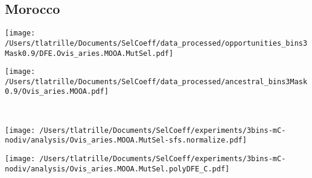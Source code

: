 \documentclass{article}
\begin{document}
    \subsection{Morocco}

    \begin{minipage}{0.49\linewidth}
        \texttt{[image: /Users/tlatrille/Documents/SelCoeff/data\_processed/opportunities\_bins3Mask0.9/DFE.Ovis\_aries.MOOA.MutSel.pdf]}
    \end{minipage}
    \begin{minipage}{0.49\linewidth}
        \texttt{[image: /Users/tlatrille/Documents/SelCoeff/data\_processed/ancestral\_bins3Mask0.9/Ovis\_aries.MOOA.pdf]}
    \end{minipage}
    \\
    \begin{minipage}{0.49\linewidth}
        \texttt{[image: /Users/tlatrille/Documents/SelCoeff/experiments/3bins-mC-nodiv/analysis/Ovis\_aries.MOOA.MutSel-sfs.normalize.pdf]}
    \end{minipage}
    \begin{minipage}{0.49\linewidth}
        \texttt{[image: /Users/tlatrille/Documents/SelCoeff/experiments/3bins-mC-nodiv/analysis/Ovis\_aries.MOOA.MutSel.polyDFE\_C.pdf]}
    \end{minipage}
    \\
\end{document}
